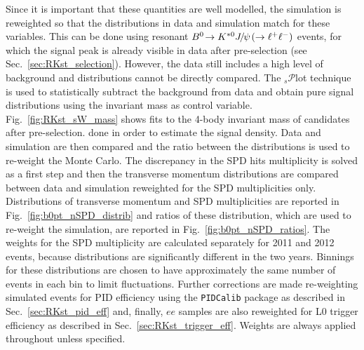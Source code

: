 Since it is important that these quantities are well modelled, the simulation is
reweighted so that the distributions in data and simulation match for these variables.
This can be done using resonant $\decay{\Bz}{\Kstarz\jpsi(\to\ll)}$ events, for which the signal peak
is already visible in data after pre-selection (see Sec.~\ref{sec:RKst_selection}). However, the data still includes
a high level of background and distributions cannot be directly compared.
The $_s\mathcal{P}$lot technique~\cite{sPlot} is used to statistically subtract the background from
data and obtain pure signal distributions using the invariant mass as control variable.
Fig.~\ref{fig:RKst_sW_mass} shows fits to the 4-body invariant mass of candidates after pre-selection.
done in order to estimate the signal density. Data and simulation are then compared 
and the ratio between the distributions is used to re-weight the Monte Carlo. The discrepancy 
in the SPD hits multiplicity is solved as a first step and then the \Bz transverse momentum 
distributions are compared between data and simulation reweighted for the SPD multiplicities only.
Distributions of \Bz transverse momentum and SPD multiplicities are reported in Fig.~\ref{fig:b0pt_nSPD_distrib}
and ratios of these distribution, which are used to re-weight the simulation, are reported in 
Fig.~\ref{fig:b0pt_nSPD_ratios}. The weights for the SPD multiplicity are calculated
separately for 2011 and 2012 events, because distributions are significantly different
in the two years. Binnings for these distributions are chosen to have approximately 
the same number of events in each bin to limit fluctuations.
Further corrections are made re-weighting simulated events for PID efficiency using the
\verb!PIDCalib! package as described in Sec.~\ref{sec:RKst_pid_eff} and, finally, 
$ee$ samples are also reweighted for L0 trigger efficiency as described in Sec.~\ref{sec:RKst_trigger_eff}.
Weights are always applied throughout unless specified.

